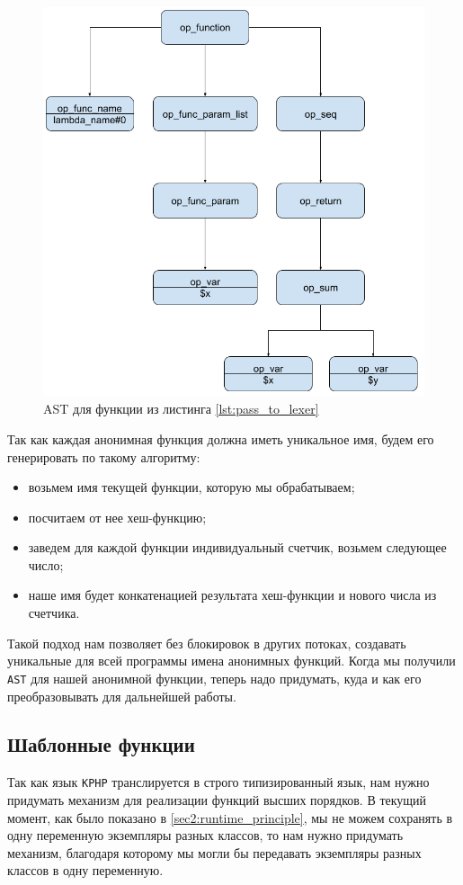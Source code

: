 \begin{figure}[H]
    \caption{AST для функции из листинга \ref{lst:pass_to_lexer}}
    \label{fig:AST_for_sum}
    \centering
    \includegraphics[width=\linewidth]{images/ast_for_id}
\end{figure}

Так как каждая анонимная функция должна иметь уникальное имя, будем его генерировать по такому алгоритму:
\begin{itemize}
  \item возьмем имя текущей функции, которую мы обрабатываем;
  \item посчитаем от нее хеш-функцию;
  \item заведем для каждой функции индивидуальный счетчик, возьмем следующее число;
  \item наше имя будет конкатенацией результата хеш-функции и нового числа из счетчика.
\end{itemize}

Такой подход нам позволяет без блокировок в других потоках, создавать уникальные для всей программы имена анонимных функций.
Когда мы получили \verb|AST| для нашей анонимной функции, теперь надо придумать, куда и как его преобразовывать для дальнейшей работы.

\subsection{Шаблонные функции}
\label{sec:template_functions}
Так как язык \verb|KPHP| транслируется в строго типизированный язык, нам нужно придумать механизм для реализации функций высших порядков.
В текущий момент, как было показано в \ref{sec2:runtime_principle}, мы не можем сохранять в одну переменную экземпляры разных классов, то нам нужно придумать механизм, благодаря которому мы могли бы передавать экземпляры разных классов в одну переменную.

